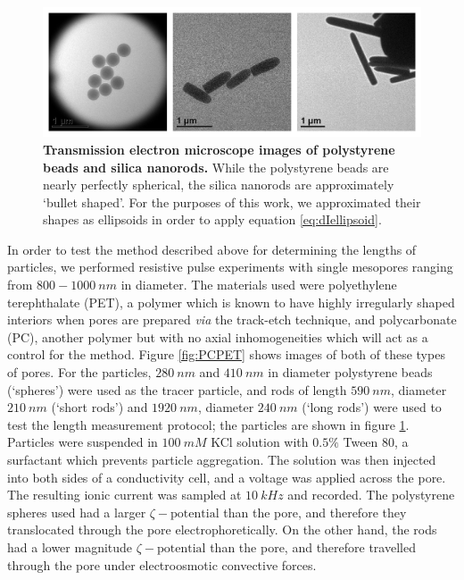 		\begin{figure}
			\includegraphics[width=1\textwidth]{particles}
			\caption{\textbf{Transmission electron microscope images of polystyrene beads and silica nanorods.} While the polystyrene beads are nearly perfectly spherical, the silica nanorods are approximately `bullet shaped'. For the purposes of this work, we approximated their shapes as ellipsoids in order to apply equation \ref{eq:dIellipsoid}.}
			\label{fig:particles}
		\end{figure}


	    
		In order to test the method described above for determining the lengths of particles, we performed resistive pulse experiments with single mesopores ranging from $800-\SI{1000}{nm}$ in diameter. The materials used were polyethylene terephthalate (PET), a polymer which is known to have highly irregularly shaped interiors when pores are prepared \textit{via} the track-etch technique, and polycarbonate (PC), another polymer but with no axial inhomogeneities which will act as a control for the method. Figure \ref{fig:PCPET} shows images of both of these types of pores. For the particles, $\SI{280}{nm}$ and $\SI{410}{nm}$ in diameter polystyrene beads (`spheres') were used as the tracer particle, and rods of length $\SI{590}{nm}$, diameter $\SI{210}{nm}$ (`short rods') and $\SI{1920}{nm}$, diameter $\SI{240}{nm}$ (`long rods') were used to test the length measurement protocol; the particles are shown in figure \ref{fig:particles}. Particles were suspended in $\SI{100}{mM}$ KCl solution with $0.5\%$ Tween 80, a surfactant which prevents particle aggregation. The solution was then injected into both sides of a conductivity cell, and a voltage was applied across the pore. The resulting ionic current was sampled at $\SI{10}{kHz}$ and recorded. The polystyrene spheres used had a larger $\zeta-\mathrm{potential}$ than the pore, and therefore they translocated through the pore electrophoretically. On the other hand, the rods had a lower magnitude $\zeta-\mathrm{potential}$ than the pore, and therefore travelled through the pore under electroosmotic convective forces. 
		
